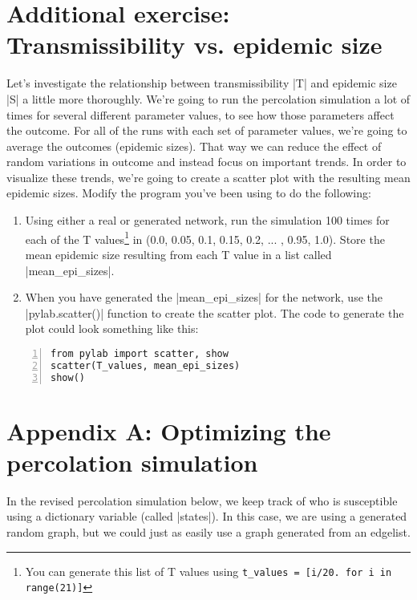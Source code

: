 \documentclass{article}
\begin{document}
\section*{Additional exercise: Transmissibility vs. epidemic size}
Let's investigate the relationship between transmissibility |T| and epidemic
size |S| a little more thoroughly.  We're going to run the percolation
simulation a lot of times for several different parameter values, to see how
those parameters affect the outcome.  For all of the runs with each set of
parameter values, we're going to average the outcomes (epidemic sizes).  That
way we can reduce the effect of random variations in outcome and instead focus on important
trends.  In order to visualize these trends, we're going to create a scatter
plot with the resulting mean epidemic sizes.  Modify the program you've been using to do the following:
\begin{enumerate}
 \item Using either a real or generated network, run the simulation 100 times for each of the T values\footnote{You can generate this list 
of T values using \texttt{t\_values = [i/20. for i in range(21)]}} in (0.0, 0.05, 0.1, 0.15, 0.2, ... , 0.95, 1.0). Store the mean epidemic size resulting 
from each T value in a list called |mean_epi_sizes|.
 \item When you have generated the |mean_epi_sizes| for the network, use
the |pylab.scatter()| function to create the scatter plot.  The code to generate the plot could
look something like this:
\end{enumerate}

\begin{Verbatim}[samepage=true, numbers=left]
from pylab import scatter, show
scatter(T_values, mean_epi_sizes)
show()
\end{Verbatim}


\pagebreak
\section*{Appendix A: Optimizing the percolation simulation}
In the revised percolation simulation below, we keep track of who is susceptible using a dictionary variable (called |states|).  In this case,
we are using a generated random graph, but we could just as easily use a graph generated from an edgelist.
\end{document}
